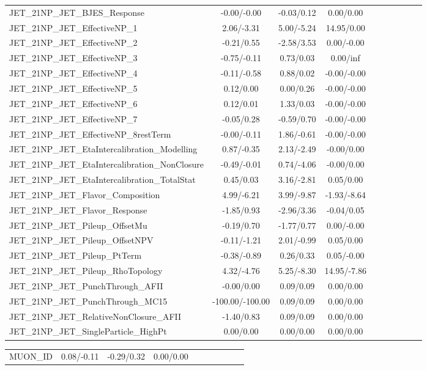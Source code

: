 \begin{table}[h]
\begin{center}
\begin{tabular}{l|ccccccccc}
JET\_21NP\_JET\_BJES\_Response &-0.00/-0.00 &-0.03/0.12 &0.00/0.00 \\
JET\_21NP\_JET\_EffectiveNP\_1 &2.06/-3.31 &5.00/-5.24 &14.95/0.00 \\
JET\_21NP\_JET\_EffectiveNP\_2 &-0.21/0.55 &-2.58/3.53 &0.00/-0.00 \\
JET\_21NP\_JET\_EffectiveNP\_3 &-0.75/-0.11 &0.73/0.03 &0.00/inf \\
JET\_21NP\_JET\_EffectiveNP\_4 &-0.11/-0.58 &0.88/0.02 &-0.00/-0.00 \\
JET\_21NP\_JET\_EffectiveNP\_5 &0.12/0.00 &0.00/0.26 &-0.00/-0.00 \\
JET\_21NP\_JET\_EffectiveNP\_6 &0.12/0.01 &1.33/0.03 &-0.00/-0.00 \\
JET\_21NP\_JET\_EffectiveNP\_7 &-0.05/0.28 &-0.59/0.70 &-0.00/-0.00 \\
JET\_21NP\_JET\_EffectiveNP\_8restTerm &-0.00/-0.11 &1.86/-0.61 &-0.00/-0.00 \\
JET\_21NP\_JET\_EtaIntercalibration\_Modelling &0.87/-0.35 &2.13/-2.49 &-0.00/0.00 \\
JET\_21NP\_JET\_EtaIntercalibration\_NonClosure &-0.49/-0.01 &0.74/-4.06 &-0.00/0.00 \\
JET\_21NP\_JET\_EtaIntercalibration\_TotalStat &0.45/0.03 &3.16/-2.81 &0.05/0.00 \\
JET\_21NP\_JET\_Flavor\_Composition &4.99/-6.21 &3.99/-9.87 &-1.93/-8.64 \\
JET\_21NP\_JET\_Flavor\_Response &-1.85/0.93 &-2.96/3.36 &-0.04/0.05 \\
JET\_21NP\_JET\_Pileup\_OffsetMu &-0.19/0.70 &-1.77/0.77 &0.00/-0.00 \\
JET\_21NP\_JET\_Pileup\_OffsetNPV &-0.11/-1.21 &2.01/-0.99 &0.05/0.00 \\
JET\_21NP\_JET\_Pileup\_PtTerm &-0.38/-0.89 &0.26/0.33 &0.05/-0.00 \\
JET\_21NP\_JET\_Pileup\_RhoTopology &4.32/-4.76 &5.25/-8.30 &14.95/-7.86 \\
JET\_21NP\_JET\_PunchThrough\_AFII &-0.00/0.00 &0.09/0.09 &0.00/0.00 \\
JET\_21NP\_JET\_PunchThrough\_MC15 &-100.00/-100.00 &0.09/0.09 &0.00/0.00 \\
JET\_21NP\_JET\_RelativeNonClosure\_AFII &-1.40/0.83 &0.09/0.09 &0.00/0.00 \\
JET\_21NP\_JET\_SingleParticle\_HighPt &0.00/0.00 &0.00/0.00 &0.00/0.00 \\
\hline \end{tabular} \end{center} \end{table} \begin{table}[h] \scriptsize \begin{center} \begin{tabular}{l|ccccccccc} \hline MUON\_ID &0.08/-0.11 &-0.29/0.32 &0.00/0.00 \\

\end{tabular}
\end{center}
\end{table}
